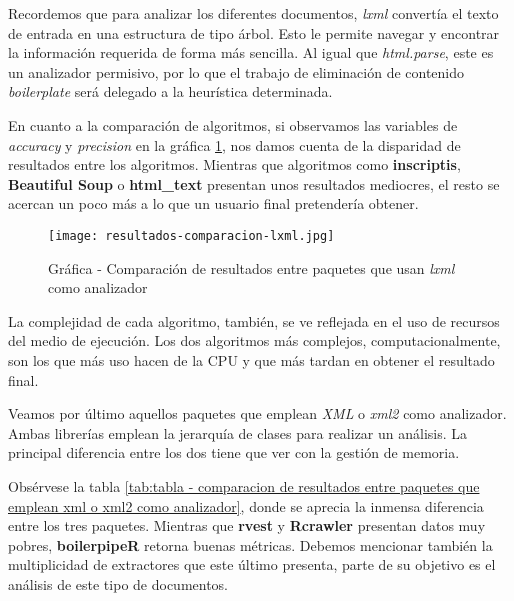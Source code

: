 Recordemos que para analizar los diferentes documentos, \emph{lxml} convertía el texto de entrada en una 
estructura de tipo árbol. Esto le permite navegar y encontrar la información requerida de forma más sencilla.
Al igual que \emph{html.parse}, este es un analizador permisivo, por lo que el trabajo de eliminación de 
contenido \emph{boilerplate} será delegado a la heurística determinada.

En cuanto a la comparación de algoritmos, si observamos las variables de \emph{accuracy} y \emph{precision}
en la gráfica \ref{img:grafica - comparacion de resultados entre paquetes que usan lxml como analizador}, 
nos damos cuenta de la disparidad de resultados entre los algoritmos. Mientras que algoritmos como 
\textbf{inscriptis}, \textbf{Beautiful Soup} o \textbf{html\_text} presentan unos resultados mediocres, el 
resto se acercan un poco más a lo que un usuario final pretendería obtener.

\begin{figure}[tphb]
    \centering
    \texttt{[image: resultados-comparacion-lxml.jpg]}
    \caption{Gráfica - Comparación de resultados entre paquetes que usan \emph{lxml} como analizador}
    \label{img:grafica - comparacion de resultados entre paquetes que usan lxml como analizador}
\end{figure}

La complejidad de cada algoritmo, también, se ve reflejada en el uso de recursos del medio de ejecución.
Los dos algoritmos más complejos, computacionalmente, son los que más uso hacen de la CPU y que más tardan
en obtener el resultado final.

Veamos por último aquellos paquetes que emplean \emph{XML} o \emph{xml2} como analizador. Ambas librerías
emplean la jerarquía de clases para realizar un análisis. La principal diferencia entre los dos tiene que
ver con la gestión de memoria.

Obsérvese la tabla \ref{tab:tabla - comparacion de resultados entre paquetes que emplean xml o xml2 como analizador}, 
donde se aprecia la inmensa diferencia entre los tres paquetes. Mientras que \textbf{rvest} y 
\textbf{Rcrawler} presentan datos muy pobres, \textbf{boilerpipeR} retorna buenas métricas. Debemos 
mencionar también la multiplicidad de extractores que este último presenta, parte de su objetivo es el 
análisis de este tipo de documentos.

